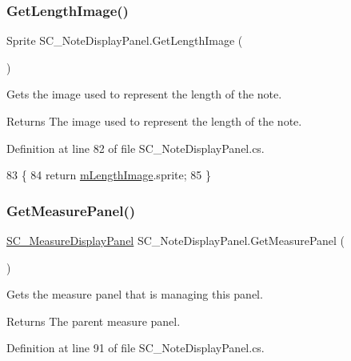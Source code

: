 \subsubsection{\texorpdfstring{Get\+Length\+Image()}{GetLengthImage()}}
{\footnotesize\ttfamily Sprite S\+C\+\_\+\+Note\+Display\+Panel.\+Get\+Length\+Image (\begin{DoxyParamCaption}{ }\end{DoxyParamCaption})}



Gets the image used to represent the length of the note. 

\begin{DoxyReturn}{Returns}
The image used to represent the length of the note. 
\end{DoxyReturn}


Definition at line 82 of file S\+C\+\_\+\+Note\+Display\+Panel.\+cs.


\begin{DoxyCode}
83     \{
84         \textcolor{keywordflow}{return} \hyperlink{group___s_c___n_d_p_priv_var_ga611f26eaf6a960570b0dd848b6712b5f}{mLengthImage}.sprite;
85     \}
\end{DoxyCode}
\mbox{\label{group___s_c___n_d_p_unity_ga404972fc48a89d678d0c6fa801573814}} 
\subsubsection{\texorpdfstring{Get\+Measure\+Panel()}{GetMeasurePanel()}}
{\footnotesize\ttfamily \hyperlink{class_s_c___measure_display_panel}{S\+C\+\_\+\+Measure\+Display\+Panel} S\+C\+\_\+\+Note\+Display\+Panel.\+Get\+Measure\+Panel (\begin{DoxyParamCaption}{ }\end{DoxyParamCaption})}



Gets the measure panel that is managing this panel. 

\begin{DoxyReturn}{Returns}
The parent measure panel. 
\end{DoxyReturn}


Definition at line 91 of file S\+C\+\_\+\+Note\+Display\+Panel.\+cs.



